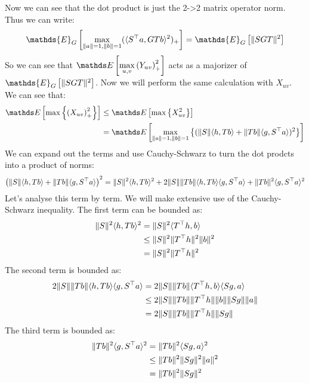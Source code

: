 Now we can see that the dot product is just the 2->2 matrix operator norm. Thus we can write:
\begin{align*}
    \mathds{E}_{G}\left[ \underset{\norm{a}=1, \norm{b}=1}{\max}(\dotprod{S^{\top}a, GTb}^2)_{+} \right] = \mathds{E}_{G}\left[ \norm{SGT}^2 \right]
\end{align*}
So we can see that $\pexp{\underset{u, v}{\max} \left( Y_{uv}\right)_{+}^2 }$ acts as a majorizer of
$\mathds{E}_{G}\left[ \norm{SGT}^2 \right]$. Now we will perform the same calculation with $X_{uv}$. We can see that:
\begin{align*}
    \pexp{\max\left\{ {(X_{uv})}_{+}^2\right\}} &\leq \pexp{\max\left\{ X_{uv}^2\right\}} \\
                                              &= \pexp{\underset{\norm{a}=1, \norm{b}=1}{\max}\left\{(\norm{S}\dotprod{h, Tb} + \norm{Tb}\dotprod{g, S^{\top}a})^2\right\}}
\end{align*}
We can expand out the terms and use Cauchy-Schwarz to turn the dot prodcts into a product of norms:
\begin{equation*}
   \left(\lVert S \rVert\langle h, Tb \rangle + \lVert Tb \rVert\langle g, S^{\top}a \rangle\right)^2 = \lVert S \rVert^2\langle h, Tb \rangle^2 + 2\lVert S \rVert\lVert Tb \rVert\langle h, Tb \rangle\langle g, S^{\top}a \rangle + \lVert Tb \rVert^2\langle g, S^{\top}a \rangle^2
\end{equation*}
Let's analyse this term by term. We will make extensive use of the Cauchy-Schwarz inequality. The first term can be bounded as:
\begin{align*}
    \lVert S \rVert^2\langle h, Tb \rangle^2 &= \lVert S \rVert^2\langle T^{\top}h, b \rangle \\
                                &\leq \lVert S \rVert^2\lVert T^{\top}h \rVert^2\lVert b \rVert^2 \\
                                &= \lVert S \rVert^2\lVert T^{\top}h \rVert^2
\end{align*}
The second term is bounded as:
\begin{align*}
    2\lVert S \rVert\lVert Tb \rVert\langle h, Tb \rangle\langle g, S^{\top}a \rangle &= 2\lVert S \rVert\lVert Tb \rVert\langle T^{\top}h, b \rangle\langle Sg, a \rangle \\
                                                            &\leq 2\lVert S \rVert\lVert Tb \rVert\lVert T^{\top}h \rVert\lVert b \rVert\lVert Sg \rVert\lVert a \rVert \\
                                                            &= 2\lVert S \rVert\lVert Tb \rVert\lVert T^{\top}h \rVert\lVert Sg \rVert
\end{align*}
The third term is bounded as:
\begin{align*}
    \lVert Tb \rVert^2\langle g, S^{\top}a \rangle^2 &= \lVert Tb \rVert^2\langle Sg, a \rangle^2 \\
                                       &\leq \lVert Tb \rVert^2\lVert Sg \rVert^2\lVert a \rVert^2 \\
                                       &= \lVert Tb \rVert^2\lVert Sg \rVert^2
\end{align*}
